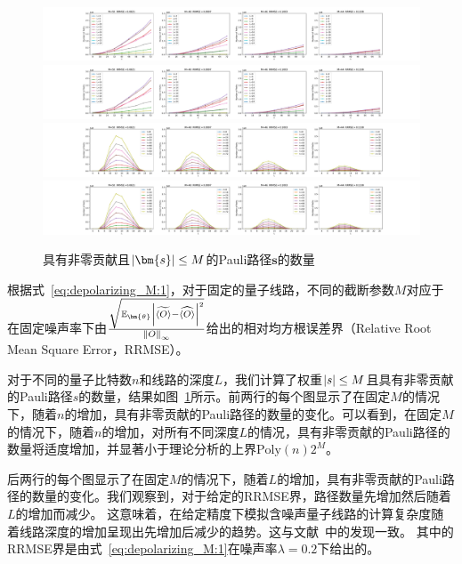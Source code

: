 \begin{figure}[hbp]
    \centering
    \includegraphics[width=\textwidth]{figures/depth_path2_p1}
    \includegraphics[width=\textwidth]{figures/depth_path2_p2}
    \includegraphics[width=\textwidth]{figures/depth_path_p1}
    \includegraphics[width=\textwidth]{figures/depth_path_p2}
    \caption{具有非零贡献且$\abs{\bm{s}}\leq M$的Pauli路径$\bm{s}$的数量}\label{fig:numerical_cost}
\end{figure}

根据式~\eqref{eq:depolarizing_M:1}，对于固定的量子线路，不同的截断参数$M$对应于在固定噪声率下由$\frac{\sqrt{\mathbb{E}_{\bm{\theta}}\abs{\widetilde{\langle O \rangle}-\widehat{\langle O \rangle}}^2}}{\norm{O}_\infty}$给出的相对均方根误差界（Relative Root Mean Square Error，RRMSE）。

对于不同的量子比特数$n$和线路的深度$L$，我们计算了权重$\abs{s}\leq M$且具有非零贡献的Pauli路径$s$的数量，结果如图~\ref{fig:numerical_cost}所示。前两行的每个图显示了在固定$M$的情况下，随着$n$的增加，具有非零贡献的Pauli路径的数量的变化。可以看到，在固定$M$的情况下，随着$n$的增加，对所有不同深度$L$的情况，具有非零贡献的Pauli路径的数量将适度增加，并显著小于理论分析的上界$\mathrm{Poly}(n)2^M$。


后两行的每个图显示了在固定$M$的情况下，随着$L$的增加，具有非零贡献的Pauli路径的数量的变化。我们观察到，对于给定的RRMSE界，路径数量先增加然后随着$L$的增加而减少。
这意味着，在给定精度下模拟含噪声量子线路的计算复杂度随着线路深度的增加呈现出先增加后减少的趋势。这与文献~\cite{noh2020efficient}中的发现一致。
其中的RRMSE界是由式~\eqref{eq:depolarizing_M:1}在噪声率$\lambda=0.2$下给出的。


